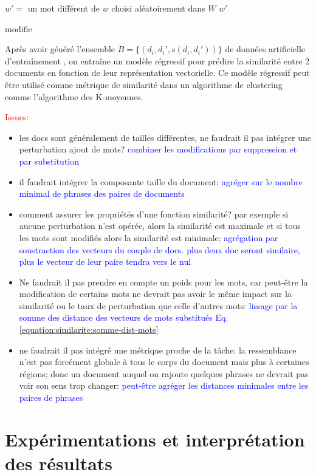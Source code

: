 \begin{algorithm}[H]
 $w' = $ un mot différent de $w$ choisi aléatoirement dans $W$\;
 \Return $w'$
 \caption{modifie} \label{algo:similarite:modifiemot}
\end{algorithm}

Après avoir généré l'ensemble $B = \lbrace (d_i, d_i', s(d_i, d_i'))\rbrace$ de données artificielle d'entraînement , on entraîne un modèle régressif pour prédire la similarité entre 2 documents en fonction de leur représentation vectorielle. Ce modèle régressif peut être utilisé comme métrique de similarité dans un algorithme de clustering comme l'algorithme des K-moyennes.

\textcolor{red}{Issues:}
\begin{itemize}
\item les docs sont généralement de tailles différentes, ne faudrait il pas intégrer une perturbation ajout de mots? \textcolor{blue}{combiner les modifications par suppression et par substitution}
\item il faudrait intégrer la composante taille du document: \textcolor{blue}{agréger sur le nombre minimal de phrases des paires de documents}
\item comment assurer les propriétés d'une fonction similarité? par exemple si aucune perturbation n'est opérée, alors la similarité est maximale et si tous les mots sont modifiés alors la similarité est minimale: \textcolor{blue}{agrégation par soustraction des vecteurs du couple de docs. plus deux doc seront similaire, plus le vecteur de leur paire tendra vers le nul}
\item Ne faudrait il pas prendre en compte un poids pour les mots, car peut-être la modification de certains mots ne devrait pas avoir le même impact sur la similarité ou le taux de perturbation que celle d'autres mots:  \textcolor{blue}{lissage par la somme des distance des vecteurs de mots substitués Eq. \ref{equation:similarite:somme-dist-mots}}
\item ne faudrait il pas intégré une métrique proche de la tâche: la ressemblance n'est pas forcément globale à tous le corps du document mais plus à certaines régions; donc un document auquel on rajoute quelques phrases ne devrait pas voir  son sens trop changer:  \textcolor{blue}{peut-être agréger les distances minimales entre les paires de phrases}
\end{itemize}

\section{Expérimentations et interprétation des résultats}
\label{sec:similarite:experimentations}


